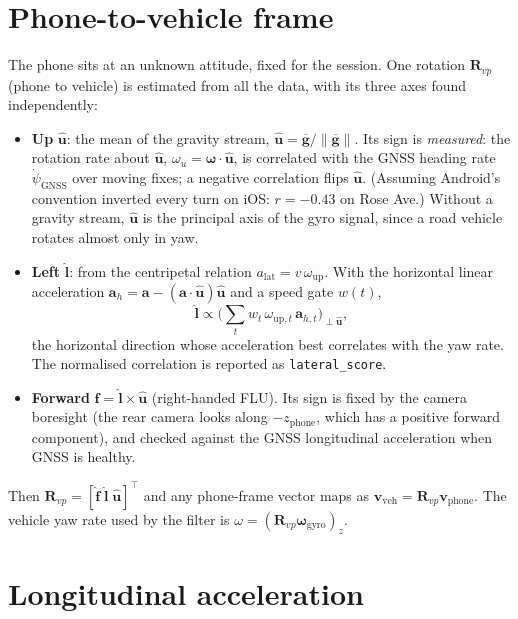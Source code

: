 \documentclass[10pt,a4paper]{article}
\begin{document}
\section{Phone-to-vehicle frame}
\label{sec:vframe}

The phone sits at an unknown attitude, fixed for the session. One rotation $\mathbf{R}_{vp}$ (phone to
vehicle) is estimated from all the data, with its three axes found independently:
\begin{itemize}
\item \textbf{Up} $\hat{\bm u}$: the mean of the gravity stream, $\hat{\bm u} = \overline{\bm g}/\|\overline{\bm g}\|$.
  Its sign is \emph{measured}: the rotation rate about $\hat{\bm u}$, $\omega_u = \bm\omega\cdot\hat{\bm u}$, is
  correlated with the GNSS heading rate $\dot\psi_\text{GNSS}$ over moving fixes; a negative correlation flips
  $\hat{\bm u}$. (Assuming Android's convention inverted every turn on iOS: $r=-0.43$ on Rose Ave.)
  Without a gravity stream, $\hat{\bm u}$ is the principal axis of the gyro signal, since a road vehicle
  rotates almost only in yaw.
\item \textbf{Left} $\hat{\bm l}$: from the centripetal relation $a_\text{lat} = v\,\omega_\text{up}$. With the
  horizontal linear acceleration $\bm a_h = \bm a - (\bm a\cdot\hat{\bm u})\hat{\bm u}$ and a speed gate $w(t)$,
  \begin{equation}
  \hat{\bm l} \propto \Big(\textstyle\sum_t w_t\,\omega_{\text{up},t}\,\bm a_{h,t}\Big)_{\perp \hat{\bm u}},
  \end{equation}
  the horizontal direction whose acceleration best correlates with the yaw rate. The normalised
  correlation is reported as \texttt{lateral\_score}.
\item \textbf{Forward} $\hat{\bm f} = \hat{\bm l} \times \hat{\bm u}$ (right-handed FLU). Its sign is fixed by the
  camera boresight (the rear camera looks along $-z_\text{phone}$, which has a positive forward component),
  and checked against the GNSS longitudinal acceleration when GNSS is healthy.
\end{itemize}
Then $\mathbf{R}_{vp} = [\hat{\bm f}\;\hat{\bm l}\;\hat{\bm u}]^\top$ and any phone-frame vector maps as
$\bm v_\text{veh} = \mathbf{R}_{vp}\bm v_\text{phone}$. The vehicle yaw rate used by the filter is
$\omega = (\mathbf{R}_{vp}\bm\omega_\text{gyro})_z$.

\section{Longitudinal acceleration}
\label{sec:accel}
\end{document}

